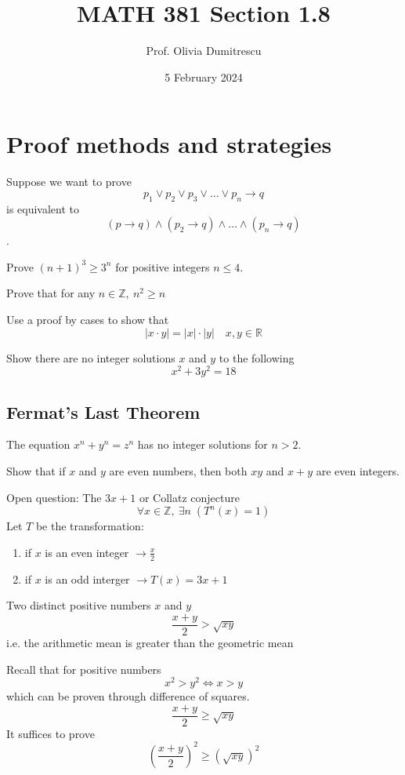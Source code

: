 \documentclass[letterpaper, 12pt]{article}
\title{MATH 381 Section 1.8}
\author{Prof. Olivia Dumitrescu}
\date{5 February 2024}
\newenvironment{proof}[1][Proof]{\begin{trivlist}
\item[\hskip \labelsep {\bfseries #1}]}{\end{trivlist}}
\newenvironment{example}[1][Example]{\begin{trivlist}
\item[\hskip \labelsep {\bfseries #1}]}{\end{trivlist}}
\newcommand{\then}{\rightarrow}
\begin{document}
    \maketitle
    \section*{Proof methods and strategies}
    Suppose we want to prove
    \[p_1 \vee p_2 \vee p_3 \vee \dots \vee p_n \then q\]
    is equivalent to
    \[(p \then q) \wedge (p_2 \then q) \wedge \dots \wedge (p_n \then q)\].
    \begin{example}
        Prove $(n + 1)^3 \ge 3^n$ for positive integers $n \le 4$.
    \end{example}
    \begin{example}
        Prove that for any $n \in \mathbb{Z}, \: n^2 \ge n$
    \end{example}
    \begin{example}
        Use a proof by cases to show that
        \[|x \cdot y| = |x| \cdot |y| \quad x, y \in \mathbb{R}\]
    \end{example}
    \begin{example}
        Show there are no integer solutions $x$ and $y$ to the following
        \[x^2 + 3y^2 = 18\]
    \end{example}
    \subsection*{Fermat's Last Theorem}
    The equation $x^n + y^n = z^n$ has no integer solutions for $n > 2$.
    \begin{example}
        Show that if $x$ and $y$ are even numbers, then both $xy$ and $x + y$ are even integers.
    \end{example}
    \begin{example}
        Open question: The $3x + 1$ or Collatz conjecture \\
        \[\forall x \in \mathbb{Z}, \: \exists n \; (T^n(x) = 1)\]
        Let $T$ be the transformation:
        \begin{enumerate}
            \item if $x$ is an even integer $\then \frac{x}{2}$
            \item if $x$ is an odd interger $\then T(x) = 3x + 1$
        \end{enumerate}
    \end{example}
    \begin{example}
        Two distinct positive numbers $x$ and $y$
        \[\frac{x + y}{2} > \sqrt{xy}\]
        i.e. the arithmetic mean is greater than the geometric mean
    \end{example}
    \begin{proof}
        Recall that for positive numbers
        \[x^2 > y^2 \iff x > y\]
        which can be proven through difference of squares.
        \[\frac{x + y}{2} \ge \sqrt{xy}\]
        It suffices to prove
        \[(\frac{x + y}{2})^2 \ge (\sqrt{xy})^2\]
    \end{proof}
\end{document}

